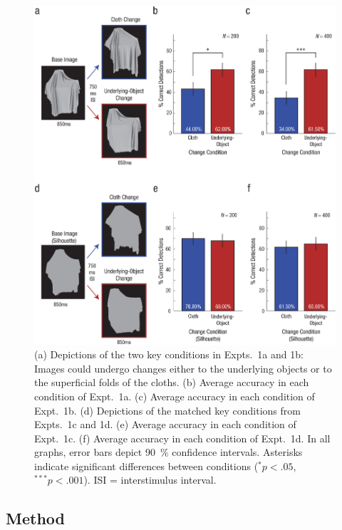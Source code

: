 \begin{figure}
    \centering
    \includegraphics[width=\textwidth]{figures/PsychSci2023/fig2_experiment1.jpeg}
    \caption
    {(a) Depictions of the two key conditions in Expts.~1a and 1b: Images could undergo changes either to the underlying objects or to the superficial folds of the cloths. (b) Average accuracy in each condition of Expt.~1a. (c) Average accuracy in each condition of Expt.~1b. (d) Depictions of the matched key conditions from Expts.~1c and 1d. (e) Average accuracy in each condition of Expt.~1c. (f) Average accuracy in each condition of Expt.~1d. In all graphs, error bars depict \qty{90}{\percent} confidence intervals. Asterisks indicate significant differences between conditions ($^{*}p < .05$, $^{***}p < .001$). ISI = interstimulus interval.}
    \label{fig:PsychSci2023_2}
\end{figure}

\subsection{Method}


